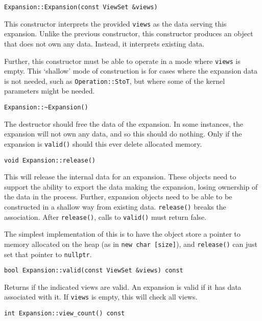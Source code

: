 \begin{lstlisting}
Expansion::Expansion(const ViewSet &views)
\end{lstlisting}

This constructor interprets the provided \texttt{views} as the data serving
this expansion. Unlike the previous constructor, this constructor produces an
object that does not own any data. Instead, it interprets existing data.

Further, this constructor must be able to operate in a mode where \texttt{views}
is empty. This `shallow' mode of construction is for cases where the
expansion data is not needed, such as \texttt{Operation::StoT}, but where
some of the kernel parameters might be needed.

\begin{lstlisting}
Expansion::~Expansion()
\end{lstlisting}


The destructor should free the data of the expansion. In some instances, the
expansion will not own any data, and so this should do nothing. Only if the
expansion is \texttt{valid()} should this ever delete allocated memory.

\begin{lstlisting}
void Expansion::release()
\end{lstlisting}


This will release the internal data for an expansion. These objects need to
support the ability to export the data making the expansion, losing ownership
of the data in the process. Further, expansion objects need to be able to be
constructed in a shallow way from existing data. \texttt{release()} breaks the
association. After \texttt{release()}, calls to \texttt{valid()} must return
false.

The simplest implementation of this is to have the object store a pointer to
memory allocated on the heap (as in \texttt{new char [size]}), and
\texttt{release()} can just set that pointer to \texttt{nullptr}.

\begin{lstlisting}
bool Expansion::valid(const ViewSet &views) const
\end{lstlisting}


Returns if the indicated views are valid. An expansion is valid if it has
data associated with it. If \texttt{views} is empty, this will check all
views.

\begin{lstlisting}
int Expansion::view_count() const
\end{lstlisting}


